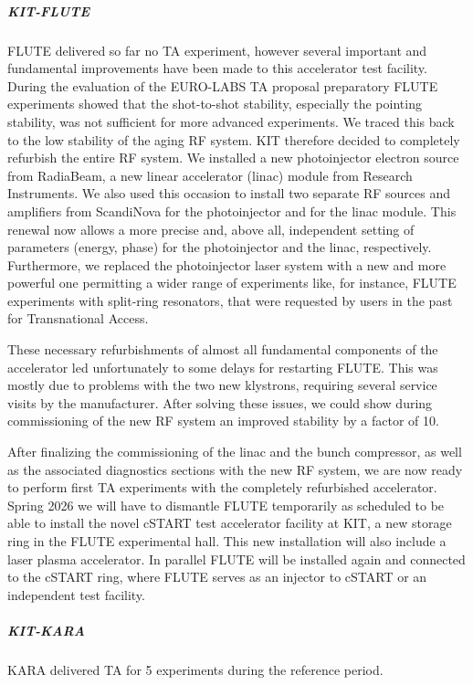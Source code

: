 \subparagraph{KIT-FLUTE} FLUTE delivered so far no TA experiment, however several important and fundamental improvements have been made to this accelerator test facility. During the evaluation of the EURO-LABS TA proposal preparatory FLUTE experiments showed that the shot-to-shot stability, especially the pointing stability, was not sufficient for more advanced experiments. We traced this back to the low stability of the aging RF system. KIT therefore decided to completely refurbish the entire RF system. We installed a new photoinjector electron source from RadiaBeam, a new linear accelerator (linac) module from Research Instruments. We also used this occasion to install two separate RF sources and amplifiers from ScandiNova for the photoinjector and for the linac module. This renewal now allows a more precise and, above all, independent setting of parameters (energy, phase) for the photoinjector and the linac, respectively. Furthermore, we replaced the photoinjector laser system with a new and more powerful one permitting a wider range of experiments like, for instance, FLUTE experiments with split-ring resonators, that were requested by users in the past for Transnational Access.

These necessary refurbishments of almost all fundamental components of the accelerator led unfortunately to some delays for restarting FLUTE. This was mostly due to problems with the two new klystrons, requiring several service visits by the manufacturer. After solving these issues, we could show during commissioning of the new RF system an improved stability by a factor of 10.

After finalizing the commissioning of the linac and the bunch compressor, as well as the associated diagnostics sections with the new RF system, we are now ready to perform first TA experiments with the completely refurbished accelerator. 
Spring 2026 we will have to dismantle FLUTE temporarily as scheduled to be able to install the novel cSTART test accelerator facility at KIT, a new storage ring in the FLUTE experimental hall. This new installation will also include a laser plasma accelerator. In parallel FLUTE will be installed again and connected to the cSTART ring, where FLUTE serves as an injector to cSTART or an independent test facility.

\subparagraph{KIT-KARA}

KARA delivered TA for 5 experiments during the reference period. 


